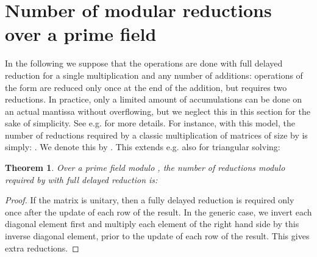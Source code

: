 \documentclass{article}
\newcommand{\customvspace}[1]{}
\newtheorem{theorem}{Theorem}
\begin{document}
 \section{Number of modular reductions over a prime field}
\label{sec:mod}

In the following we suppose that the operations are done with full
delayed reduction for a single multiplication and any number of
additions: operations of the form  are reduced only once
at the end of the addition, but  requires two
reductions.
In practice, only a limited amount of accumulations can be done on an
actual mantissa without overflowing, but we neglect this in this
section for the sake of simplicity. 
See e.g. \cite{jgd:2008:toms} for more details. 
For instance, with this model, the number of reductions required by a
classic multiplication of matrices of size  by 
is simply: . We denote this by .
This extends e.g. also for triangular solving:

\begin{theorem}\label{thm:trsm}
Over a prime field modulo , the number of reductions modulo  required by
 with full delayed reduction is:

\customvspace{-5pt}
\end{theorem}
\begin{proof} 
If the matrix is unitary, then a fully delayed reduction is required
only once after the update of each row of the result.
In the generic case, we invert each diagonal element first and
multiply each element of the right hand side by this inverse diagonal
element, prior to the update of each row of the result. This gives
 extra reductions. 
\end{proof}
\end{document}

